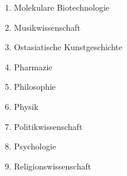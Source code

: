 \begin{enumerate}[noitemsep]
        \item Molekulare Biotechnologie                                                                                                                                                                                   \\
        \item Musikwissenschaft                                                                                                                                                                                           \\
        \item Ostasiatische Kunstgeschichte                                                                                                                                                                               \\
        \item Pharmazie                                                                                                                                                                                                   \\
        \item Philosophie                                                                                                                                                                                                 \\
        \item Physik                                                                                                                                                                                                      \\
        \item Politikwissenschaft                                                                                                                                                                                         \\
        \item Psychologie                                                                                                                                                                                                 \\
        \item Religionswissenschaft                                                                                                                                                                                       \\

\end{enumerate}
